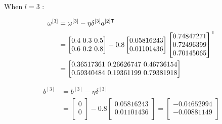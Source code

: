 \documentclass{article}
\begin{document}
When $l = 3$ :

\[
    \begin{aligned}
        \omega^{[3]} & =\omega^{[3]}-\eta\delta^{[3]}a^{[2]\mathsf{T}} \\
                     & =\begin{bmatrix}
                            0.4 $ 0.3 $ 0.5 \\
                            0.6 $ 0.2 $ 0.8 \\
                        \end{bmatrix}
        - 0.8 \begin{bmatrix}
                  0.05816243 \\
                  0.01101436 \\
              \end{bmatrix}
        \begin{bmatrix}
            0.74847271 \\
            0.72496399 \\
            0.70145065 \\
        \end{bmatrix}^{\mathsf{T}}                               \\
                     & = \begin{bmatrix}
                             0.36517361 $ 0.26626747 $ 0.46736154 \\
                             0.59340484 $ 0.19361199 $ 0.79381918 \\
                         \end{bmatrix}
    \end{aligned}
\]

\[
    \begin{aligned}
        b^{[3]} & =b^{[3]}-\eta\delta^{[3]} \\
                & =\begin{bmatrix}
                       0 \\
                       0 \\
                   \end{bmatrix}
        - 0.8 \begin{bmatrix}
                  0.05816243 \\
                  0.01101436 \\
              \end{bmatrix}
        = \begin{bmatrix}
              -0.04652994 \\
              -0.00881149 \\
          \end{bmatrix}
    \end{aligned}
\]
\end{document}
